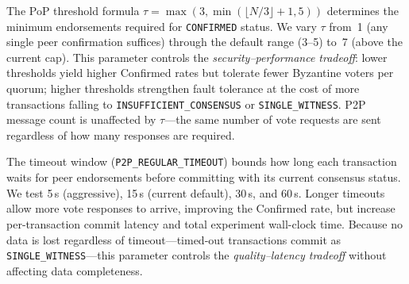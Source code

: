 The PoP threshold formula $\tau = \max(3, \min(\lfloor N/3 \rfloor + 1, 5))$ determines the minimum endorsements required for \texttt{CONFIRMED} status. We vary $\tau$ from~1 (any single peer confirmation suffices) through the default range (3--5) to~7 (above the current cap). This parameter controls the \emph{security--performance tradeoff}: lower thresholds yield higher Confirmed rates but tolerate fewer Byzantine voters per quorum; higher thresholds strengthen fault tolerance at the cost of more transactions falling to \texttt{INSUFFICIENT\_CONSENSUS} or \texttt{SINGLE\_WITNESS}. P2P message count is unaffected by $\tau$---the same number of vote requests are sent regardless of how many responses are required.

The timeout window (\texttt{P2P\_REGULAR\_TIMEOUT}) bounds how long each transaction waits for peer endorsements before committing with its current consensus status. We test 5\,s (aggressive), 15\,s (current default), 30\,s, and 60\,s. Longer timeouts allow more vote responses to arrive, improving the Confirmed rate, but increase per-transaction commit latency and total experiment wall-clock time. Because no data is lost regardless of timeout---timed-out transactions commit as \texttt{SINGLE\_WITNESS}---this parameter controls the \emph{quality--latency tradeoff} without affecting data completeness.


